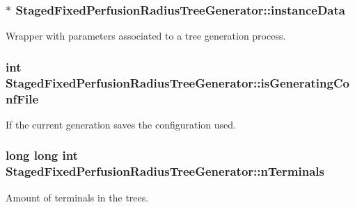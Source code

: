 \subsubsection[{\texorpdfstring{instance\+Data}{instanceData}}]{$\ast$ Staged\+Fixed\+Perfusion\+Radius\+Tree\+Generator\+::instance\+Data\hspace{0.3cm}{\ttfamily [private]}}\hypertarget{class_staged_fixed_perfusion_radius_tree_generator_a1b8f6b967274fe549955c6066f8836cc}{}\label{class_staged_fixed_perfusion_radius_tree_generator_a1b8f6b967274fe549955c6066f8836cc}
Wrapper with parameters associated to a tree generation process. 
\subsubsection[{\texorpdfstring{is\+Generating\+Conf\+File}{isGeneratingConfFile}}]{\setlength{\rightskip}{0pt plus 5cm}int Staged\+Fixed\+Perfusion\+Radius\+Tree\+Generator\+::is\+Generating\+Conf\+File\hspace{0.3cm}{\ttfamily [private]}}\hypertarget{class_staged_fixed_perfusion_radius_tree_generator_aeb2b61eca4e60b31209eb87730153db7}{}\label{class_staged_fixed_perfusion_radius_tree_generator_aeb2b61eca4e60b31209eb87730153db7}
If the current generation saves the configuration used. 
\subsubsection[{\texorpdfstring{n\+Terminals}{nTerminals}}]{\setlength{\rightskip}{0pt plus 5cm}long long int Staged\+Fixed\+Perfusion\+Radius\+Tree\+Generator\+::n\+Terminals\hspace{0.3cm}{\ttfamily [private]}}\hypertarget{class_staged_fixed_perfusion_radius_tree_generator_a2ae587dc32819ae4384fd095bc236511}{}\label{class_staged_fixed_perfusion_radius_tree_generator_a2ae587dc32819ae4384fd095bc236511}
Amount of terminals in the trees. 
